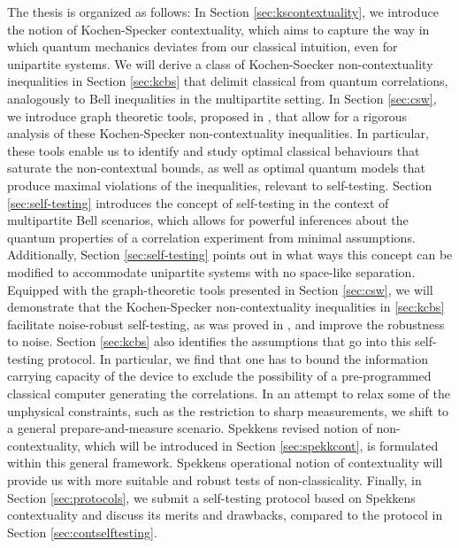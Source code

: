 The thesis is organized as follows:
In Section \ref{sec:kscontextuality}, we introduce the notion of Kochen-Specker contextuality, which aims to capture the way in which quantum mechanics deviates from our classical intuition, even for unipartite systems. We will derive a class of Kochen-Soecker non-contextuality inequalities in Section \ref{sec:kcbs} that delimit classical from quantum correlations, analogously to Bell inequalities in the multipartite setting. In Section \ref{sec:csw}, we introduce graph theoretic tools, proposed in \cite{Cabello2014}, that allow for a rigorous analysis of these Kochen-Specker non-contextuality inequalities. In particular, these tools enable us to identify and study optimal classical behaviours that saturate the non-contextual bounds, as well as optimal quantum models that produce maximal violations of the inequalities, relevant to self-testing. Section \ref{sec:self-testing} introduces the concept of self-testing in the context of multipartite Bell scenarios, which allows for powerful inferences about the quantum properties of a correlation experiment from minimal assumptions. Additionally, Section \ref{sec:self-testing} points out in what ways this concept can be modified to accommodate unipartite systems with no space-like separation. Equipped with the graph-theoretic tools presented in Section \ref{sec:csw}, we will demonstrate that the Kochen-Specker non-contextuality inequalities in \ref{sec:kcbs} facilitate noise-robust self-testing, as was proved in \cite{Bharti2019}, and improve the robustness to noise. Section \ref{sec:kcbs} also identifies the assumptions that go into this self-testing protocol. In particular, we find that one has to bound the information carrying capacity of the device to exclude the possibility of a pre-programmed classical computer generating the correlations. In an attempt to relax some of the unphysical constraints, such as the restriction to sharp measurements, we shift to a general prepare-and-measure scenario. Spekkens revised notion of non-contextuality, which will be introduced in Section \ref{sec:spekkcont}, is formulated within this general framework. Spekkens operational notion of contextuality will provide us with more suitable and robust tests of non-classicality.
Finally, in Section \ref{sec:protocols}, we submit a self-testing protocol based on Spekkens contextuality and discuss its merits and drawbacks, compared to the protocol in Section \ref{sec:contselftesting}.